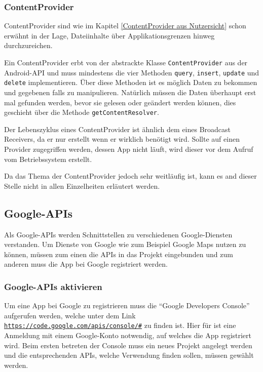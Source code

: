 \subsubsection{ContentProvider}
ContentProvider sind wie im Kapitel \ref{ContentProvider aus Nutzersicht} schon erw\"ahnt in der Lage, Dateiinhalte \"uber Applikationsgrenzen hinweg durchzureichen.

Ein ContentProvider erbt von der abstrackte Klasse \texttt{ContentProvider} aus der Android-API und muss mindestens die vier Methoden \texttt{query}, \texttt{insert}, \texttt{update} und \texttt{delete} implementieren. \"Uber diese Methoden ist es m\"oglich Daten zu bekommen und gegebenen falls zu manipulieren. Nat\"urlich m\"ussen die Daten \"uberhaupt erst mal gefunden werden, bevor sie gelesen oder ge\"andert werden k\"onnen, dies geschieht \"uber die Methode \texttt{getContentResolver}. \cite{Kuehn12}

Der Lebenszyklus eines ContentProvider ist \"ahnlich dem eines Broadcast Receivers, da er nur erstellt wenn er wirklich ben\"otigt wird. Sollte auf einen Provider zugegriffen werden, dessen App nicht l\"auft, wird dieser vor dem Aufruf vom Betriebssystem erstellt.

Da das Thema der ContentProvider jedoch sehr weitl\"aufig ist, kann es and dieser Stelle nicht in allen Einzelheiten erl\"autert werden. 

\subsection{Google-APIs} \label{Google-APIs}
Als Google-APIs werden Schnittstellen zu verschiedenen Google-Diensten verstanden. Um Dienste von Google wie zum Beispiel Google Maps nutzen zu k\"onnen, m\"ussen zum einen die APIs in das Projekt eingebunden und zum anderen muss die App bei Google registriert werden.


\subsubsection{Google-APIs aktivieren}
Um eine App bei Google zu registrieren muss die "`Google Developers Console"' aufgerufen werden, welche unter dem Link \texttt{\url{https://code.google.com/apis/console/\#}} zu finden ist. Hier f\"ur ist eine Anmeldung mit einem Google-Konto notwendig, auf welches die App registriert wird. Beim ersten betreten der Console muss ein neues Projekt angelegt werden und die entsprechenden APIs, welche Verwendung finden sollen, m\"ussen gew\"ahlt werden.


